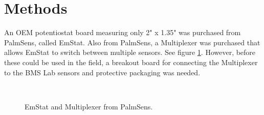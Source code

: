 \documentclass[
10pt, %
letterpaper, %
oneside, %
headinclude,footinclude, %
BCOR5mm, %
]{scrartcl}
\begin{document}

\section{Methods}





An OEM potentiostat board measuring only 2" x 1.35" was purchased from PalmSens, called EmStat.
Also from PalmSens, a Multiplexer was purchased that allows EmStat to switch between multiple sensors.
See figure \ref{emstat}.
However, before these could be used in the field,
a breakout board for connecting the Multiplexer to the BMS Lab sensors and protective packaging was needed.

\begin{figure}[tb]
\centering
{}	\quad
{}	\\
	\quad
{}
\caption{EmStat and Multiplexer from PalmSens.}
\label{emstat}
\end{figure}
\end{document}
